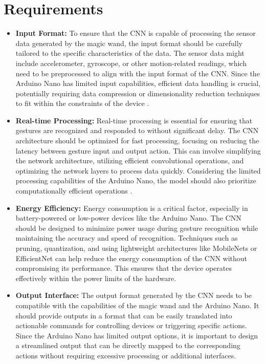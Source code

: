 \section{Requirements}
\begin{itemize}
	\item \textbf{Input Format:} 
	To ensure that the CNN is capable of processing the sensor data generated by the magic wand, the input format should be carefully tailored to the specific characteristics of the data. The sensor data might include accelerometer, gyroscope, or other motion-related readings, which need to be preprocessed to align with the input format of the CNN. Since the Arduino Nano has limited input capabilities, efficient data handling is crucial, potentially requiring data compression or dimensionality reduction techniques to fit within the constraints of the device \cite{Warden:2020}.
	
	\item \textbf{Real-time Processing:} 
	Real-time processing is essential for ensuring that gestures are recognized and responded to without significant delay. The CNN architecture should be optimized for fast processing, focusing on reducing the latency between gesture input and output action. This can involve simplifying the network architecture, utilizing efficient convolutional operations, and optimizing the network layers to process data quickly. Considering the limited processing capabilities of the Arduino Nano, the model should also prioritize computationally efficient operations \cite{Munoz:2019}.
	
	\item \textbf{Energy Efficiency:} 
	Energy consumption is a critical factor, especially in battery-powered or low-power devices like the Arduino Nano. The CNN should be designed to minimize power usage during gesture recognition while maintaining the accuracy and speed of recognition. Techniques such as pruning, quantization, and using lightweight architectures like MobileNets or EfficientNet can help reduce the energy consumption of the CNN without compromising its performance. This ensures that the device operates effectively within the power limits of the hardware.
	
	\item \textbf{Output Interface:}
	The output format generated by the CNN needs to be compatible with the capabilities of the magic wand and the Arduino Nano. It should provide outputs in a format that can be easily translated into actionable commands for controlling devices or triggering specific actions. Since the Arduino Nano has limited output options, it is important to design a streamlined output that can be directly mapped to the corresponding actions without requiring excessive processing or additional interfaces.
	

\end{itemize}
